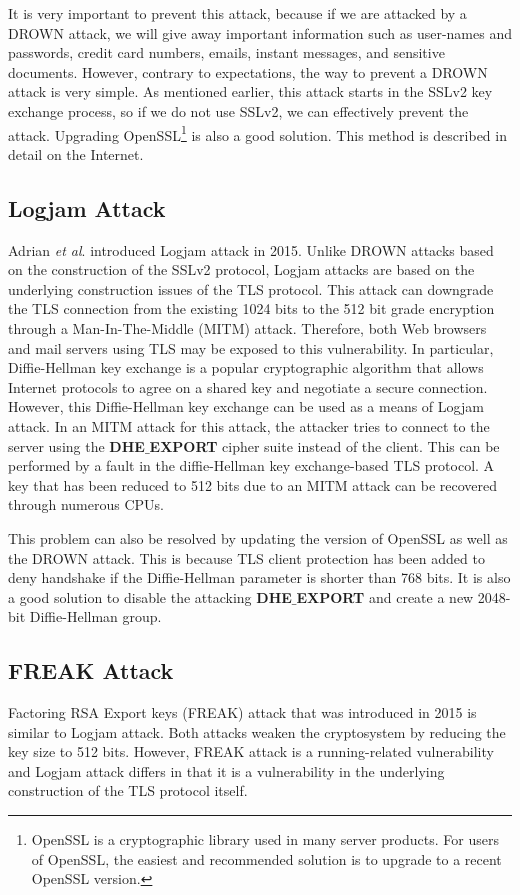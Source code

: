 \documentclass[a4paper]{article}
\begin{document}
It is very important to prevent this attack, because if we are attacked by a DROWN attack, we will give away important information such as user-names and passwords, credit card numbers, emails, instant messages, and sensitive documents. However, contrary to expectations, the way to prevent a DROWN attack is very simple. As mentioned earlier, this attack starts in the SSLv2 key exchange process, so if we do not use SSLv2, we can effectively prevent the attack. Upgrading OpenSSL\footnote{OpenSSL is a cryptographic library used in many server products. For users of OpenSSL, the easiest and recommended solution is to upgrade to a recent OpenSSL version.} is also a good solution. This method \cite{Openssl} is described in detail on the Internet.

\subsection{Logjam Attack}
Adrian \textit{et al}.\cite{logjam} introduced Logjam attack in 2015. Unlike DROWN attacks based on the construction of the SSLv2 protocol, Logjam attacks are based on the underlying construction issues of the TLS protocol. This attack can downgrade the TLS connection from the existing 1024 bits to the 512 bit grade encryption through a Man-In-The-Middle (MITM) attack. Therefore, both Web browsers and mail servers using TLS may be exposed to this vulnerability. In particular, Diffie-Hellman key exchange is a popular cryptographic algorithm that allows Internet protocols to agree on a shared key and negotiate a secure connection. However, this Diffie-Hellman key exchange can be used as a means of Logjam attack. In an MITM attack for this attack, the attacker tries to connect to the server using the \textbf{DHE$\_$EXPORT} cipher suite instead of the client. This can be performed by a fault in the diffie-Hellman key exchange-based TLS protocol. A key that has been reduced to 512 bits due to an MITM attack can be recovered through numerous CPUs.

This problem can also be resolved by updating the version of OpenSSL as well as the DROWN attack. This is because TLS client protection has been added to deny handshake if the Diffie-Hellman parameter is shorter than 768 bits. It is also a good solution to disable the attacking \textbf{DHE$\_$EXPORT} and create a new 2048-bit Diffie-Hellman group.

\subsection{FREAK Attack}
Factoring RSA Export keys (FREAK) attack that was introduced in 2015 is similar to Logjam attack. Both attacks weaken the cryptosystem by reducing the key size to 512 bits. However, FREAK attack is a running-related vulnerability and Logjam attack differs in that it is a vulnerability in the underlying construction of the TLS protocol itself.
\end{document}
